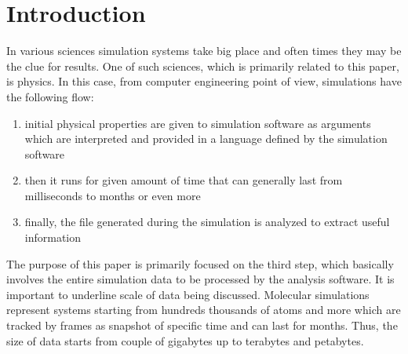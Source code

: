 \documentclass[11pt,a4paper]{report}
\begin{document}

\chapter{Introduction}

\justify
In various sciences simulation systems take big place and often times they may be the clue for results. One of such sciences, which is primarily related to this paper, is physics. In this case, from computer engineering point of view, simulations have the following flow:

\vspace{5mm}

\begin{enumerate}
	\item initial physical properties are given to simulation software as arguments which are interpreted and provided in a language defined by the simulation software
	\item then it runs for given amount of time that can generally last from milliseconds to months or even more
	\item finally, the file generated during the simulation is analyzed to extract useful information
\end{enumerate}

\vspace{3mm}
The purpose of this paper is primarily focused on the third step, which basically involves the entire simulation data to be processed by the analysis software. It is important to underline scale of data being discussed. Molecular simulations represent systems starting from hundreds thousands of atoms and more which are tracked by frames as snapshot of specific time and can last for months. Thus, the size of data starts from couple of gigabytes up to terabytes and petabytes.
\end{document}
